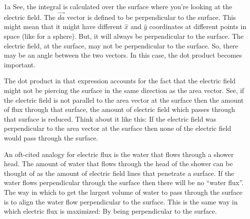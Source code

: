 \begin{homeworkProblem}[Quiz 3, Pr. 1]
\begin{homeworkSection}{1a}
        See, the integral is calculated over the surface where you're
        looking at the electric field. The $\vec{da}$ vector is defined
        to be perpendicular to the surface. This might mean that it
        might have different $\hat{x}$ and $\hat{y}$ coordinates at
        different points in space (like for a sphere). But, it will
        always be perpendicular to the surface. The electric field, at
        the surface, may not be perpendicular to the surface. So, there
        may be an angle between the two vectors. In this case, the dot
        product becomes important.

        The dot product in that expression accounts for the fact that
        the electric field might not be piercing the surface in the same
        direction as the area vector. See, if the electric field is not
        parallel to the area vector at the surface %
        then the amount of flux through that surface, the amount of
        electric field which passes through that surface is reduced.
        Think about it like this: If the electric field was
        perpendicular to the area vector at the surface then none of the
        electric field would pass through the surface.
        
        An oft-cited analogy for electric flux is the water that flows
        through a shower head. The amount of water that flows through
        the head of the shower can be thought of as the amount of
        electric field lines that penetrate a surface. If the water
        flows perpendicular through the surface then there will be no
        ``water flux''. The way in which to get the largest volume of
        water to pass through the surface is to align the water flow
        perpendicular to the surface. This is the same way in which
        electric flux is maximized: By being perpendicular to the
        surface.


\end{homeworkSection}
\end{homeworkProblem}
